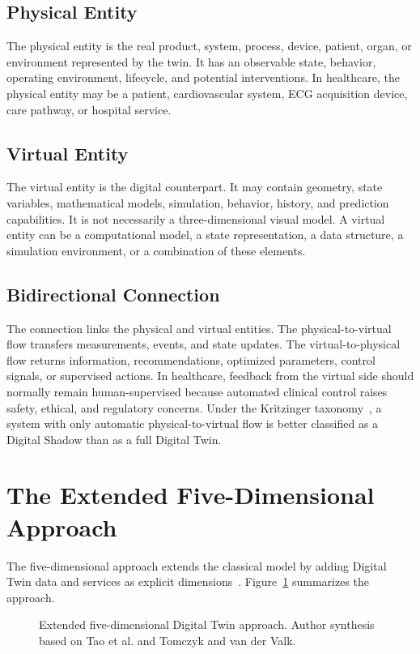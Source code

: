 \subsection*{Physical Entity}
The physical entity is the real product, system, process, device, patient, organ, or environment represented by the twin. It has an observable state, behavior, operating environment, lifecycle, and potential interventions. In healthcare, the physical entity may be a patient, cardiovascular system, ECG acquisition device, care pathway, or hospital service.

\subsection*{Virtual Entity}
The virtual entity is the digital counterpart. It may contain geometry, state variables, mathematical models, simulation, behavior, history, and prediction capabilities. It is not necessarily a three-dimensional visual model. A virtual entity can be a computational model, a state representation, a data structure, a simulation environment, or a combination of these elements.

\subsection*{Bidirectional Connection}
The connection links the physical and virtual entities. The physical-to-virtual flow transfers measurements, events, and state updates. The virtual-to-physical flow returns information, recommendations, optimized parameters, control signals, or supervised actions. In healthcare, feedback from the virtual side should normally remain human-supervised because automated clinical control raises safety, ethical, and regulatory concerns. Under the Kritzinger taxonomy~\cite{kritzinger2018digital}, a system with only automatic physical-to-virtual flow is better classified as a Digital Shadow than as a full Digital Twin.

\section{The Extended Five-Dimensional Approach}
The five-dimensional approach extends the classical model by adding Digital Twin data and services as explicit dimensions~\cite{tao2018digitalTwinDriven,tao2019digital,qi2018digital,tomczyk2022paradigm}. Figure~\ref{fig:dt_extended_five_dimensions} summarizes the approach.

\begin{figure}[H]
    \centering
    \resizebox{0.82\textwidth}{!}{}
    \caption{Extended five-dimensional Digital Twin approach. Author synthesis based on Tao et al. and Tomczyk and van der Valk.}
    \label{fig:dt_extended_five_dimensions}
\end{figure}

